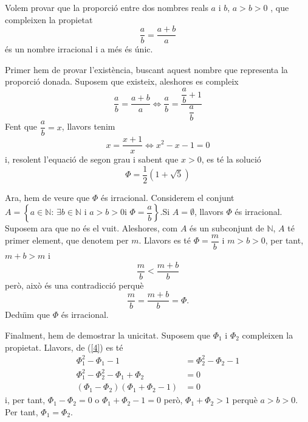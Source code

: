 \begin{exemple}
Volem provar que la proporci\'{o} entre dos nombres reals $a$ i $b$, $a>b>0$%
, que compleixen la propietat%
\begin{equation*}
\frac{a}{b}=\frac{a+b}{a}
\end{equation*}
\'{e}s un nombre irracional i a m\'{e}s \'{e}s \'{u}nic.
\end{exemple}

\begin{solucio}
Primer hem de provar l'exist\`{e}ncia, buscant aquest nombre que representa
la proporci\'{o} donada. Suposem que existeix, aleshores es compleix%
\begin{equation*}
\frac{a}{b}=\frac{a+b}{a}\Longleftrightarrow\frac{a}{b}=\frac{\dfrac{a}{b}+1%
}{\dfrac{a}{b}}
\end{equation*}
Fent que $\dfrac{a}{b}=x$, llavors tenim%
\begin{equation*}
x=\frac{x+1}{x}\Longleftrightarrow x^{2}-x-1=0
\end{equation*}
i, resolent l'equaci\'{o} de segon grau i sabent que $x>0$, es t\'{e} la
soluci\'{o}%
\begin{equation*}
\Phi=\frac{1}{2}\left( 1+\sqrt{5}\right)
\end{equation*}

Ara, hem de veure que $\Phi$ \'{e}s irracional. Considerem el conjunt $%
A=\left\{ a\in\mathbb{N}\text{: }\exists b\in\mathbb{N}\text{ i }a>b>0\text{
i }\Phi=\dfrac{a}{b}\right\} $.Si $A=\emptyset$, llavors $\Phi$ \'{e}s
irracional. Suposem ara que no \'{e}s el vuit. Aleshores, com $A$ \'{e}s un
subconjunt de $\mathbb{N}$, $A$ t\'{e} primer element, que denotem per $m$.
Llavors es t\'{e} $\Phi=\dfrac{m}{b}$ i $m>b>0$, per tant, $m+b>m$ i%
\begin{equation*}
\dfrac{m}{b}<\frac{m+b}{b}
\end{equation*}
per\`{o}, aix\`{o} \'{e}s una contradicci\'{o} perqu\`{e}%
\begin{equation*}
\frac{m}{b}=\frac{m+b}{b}=\Phi\text{.}
\end{equation*}
Dedu\"{\i}m que $\Phi$ \'{e}s irracional.

Finalment, hem de demostrar la unicitat. Suposem que $\Phi_{1}$ i $\Phi_{2} $
compleixen la propietat. Llavors, de (\ref{4}) es t\'{e}%
\begin{align*}
\Phi_{1}^{2}-\Phi_{1}-1 & =\Phi_{2}^{2}-\Phi_{2}-1 \\
\Phi_{1}^{2}-\Phi_{2}^{2}-\Phi_{1}+\Phi_{2} & =0 \\
\left( \Phi_{1}-\Phi_{2}\right) \left( \Phi_{1}+\Phi_{2}-1\right) & =0
\end{align*}
i, per tant, $\Phi_{1}-\Phi_{2}=0$ o $\Phi_{1}+\Phi_{2}-1=0$ per\`{o}, $%
\Phi_{1}+\Phi_{2}>1$ perqu\`{e} $a>b>0$. Per tant, $\Phi_{1}=\Phi_{2}$.
\end{solucio}

